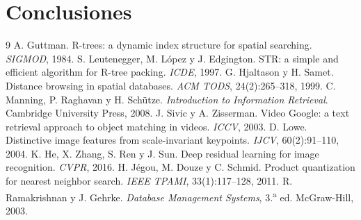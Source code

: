 \documentclass[11pt,a4paper]{article}
\begin{document}
\section{Conclusiones}



\begin{thebibliography}{9}
 A. Guttman. R-trees: a dynamic index structure for spatial searching. \emph{SIGMOD}, 1984.
 S. Leutenegger, M. López y J. Edgington. STR: a simple and efficient algorithm for R-tree packing. \emph{ICDE}, 1997.
 G. Hjaltason y H. Samet. Distance browsing in spatial databases. \emph{ACM TODS}, 24(2):265--318, 1999.
 C. Manning, P. Raghavan y H. Schütze. \emph{Introduction to Information Retrieval}. Cambridge University Press, 2008.
 J. Sivic y A. Zisserman. Video Google: a text retrieval approach to object matching in videos. \emph{ICCV}, 2003.
 D. Lowe. Distinctive image features from scale-invariant keypoints. \emph{IJCV}, 60(2):91--110, 2004.
 K. He, X. Zhang, S. Ren y J. Sun. Deep residual learning for image recognition. \emph{CVPR}, 2016.
 H. Jégou, M. Douze y C. Schmid. Product quantization for nearest neighbor search. \emph{IEEE TPAMI}, 33(1):117--128, 2011.
 R. Ramakrishnan y J. Gehrke. \emph{Database Management Systems}, 3.\textsuperscript{a} ed. McGraw-Hill, 2003.
\end{thebibliography}
\end{document}
